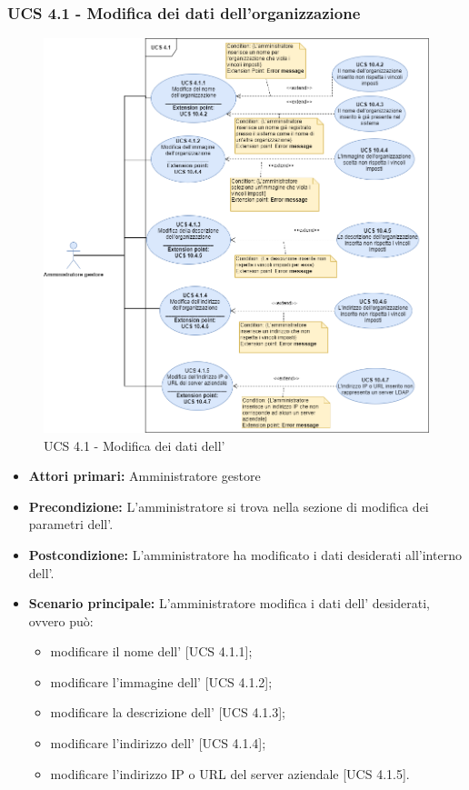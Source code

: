 \subsubsection{UCS 4.1 - Modifica dei dati dell'organizzazione}%
\begin{figure}[h]
	\centering
	\includegraphics[scale=0.53]{Sezioni/UseCase/Immagini/UCS4.1.png}
	\caption{UCS 4.1 - Modifica dei dati dell'}
\end{figure}
\begin{itemize}
	\item \textbf{Attori primari:} Amministratore gestore
	\item \textbf{Precondizione:} L'amministratore si trova nella sezione di modifica dei parametri dell'.
	\item \textbf{Postcondizione:} L'amministratore ha modificato i dati desiderati all'interno dell'.
	\item \textbf{Scenario principale:} L'amministratore modifica i dati dell' desiderati, ovvero può:
	\begin{itemize}
		\item modificare il nome dell' [UCS 4.1.1];
		\item modificare l'immagine dell' [UCS 4.1.2];
		\item modificare la descrizione dell' [UCS 4.1.3];
		\item modificare l'indirizzo dell' [UCS 4.1.4];
		\item modificare l'indirizzo IP o URL del server aziendale [UCS 4.1.5].
	\end{itemize}
\end{itemize}

